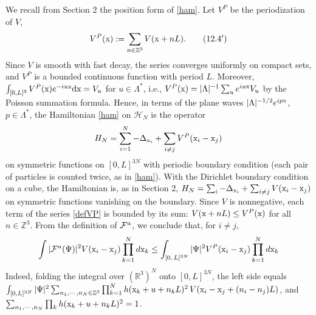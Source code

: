 \documentclass[11pt]{article}
\numberwithin{equation}{section}
\newcommand{\rd}{{\rm d}}
\newcommand{\x}{{\rm x}}
\newcommand{\beq}{\begin{equation}}
\newcommand{\eeq}{\end{equation}}
\newcommand\Z{{\mathbb Z}}
\newcommand\R{{\mathbb R}}
\theoremstyle{definition}
\begin{document}
We recall from Section 2 the position form of \eqref{ham}. Let $V^P$ be the periodization of $V$,
\[
V^P(\x):=\sum_{n\in\Z^3}V(\x+nL) . \tag{12.4$'$}\label{defVP}
\]
Since $V$ is smooth with fast decay, the series converges uniformly on compact sets, and $V^P$ is a bounded continuous function with period $L$. Moreover,
$\int_{[0,L]^3}V^P(\x)e^{-iu\x}\rd\x=V_u$ for $u\in\Lambda^*$, i.e., $V^P(\x)=|\Lambda|^{-1}\sum_{u}e^{iu\x}V_u$ by the Poisson summation formula.
Hence, in terms of the plane waves $|\Lambda|^{-1/2}e^{ip\x}$, $p\in\Lambda^*$, the Hamiltonian \eqref{ham} on $\mathcal H_N$ is the operator
\[
H_N=\sum_{i=1}^N-\Delta_{\x_i}+\sum_{i\neq j}V^P(\x_i-\x_j)
\]
on symmetric functions on $[0,L]^{3N}$ with periodic boundary condition (each pair of particles is counted twice, as in \eqref{ham}).
With the Dirichlet boundary condition on a cube, the Hamiltonian is, as in Section 2, $H_N=\sum_{i}-\Delta_{\x_i}+\sum_{i\neq j}V(\x_i-\x_j)$ on symmetric functions vanishing on the boundary.
%
Since $V$ is nonnegative, each term of the series \eqref{defVP} is bounded by its sum: $V(\x+nL)\leq V^P(\x)$ for all $n\in\Z^3$.
{F}rom the definition of    ${\cal F}^u$, we conclude that, for $i\neq j$,
\beq\nonumber
\int |{\cal F}^u(\Psi)|^2V(\x_i-\x_j)\prod_{k=1}^N d\x_k \le
\int_{[0,\,L]^{3N}} |\Psi|^2 V^P(\x_i-\x_j)\prod_{k=1}^Nd\x_k
\eeq
Indeed, folding the integral over $(\R^3)^N$ onto $[0,L]^{3N}$, the left side equals
$\int_{[0,L]^{3N}}|\Psi|^2\sum_{n_1,\cdots,n_N\in\Z^3}\prod_{k=1}^Nh(\x_k+u+n_kL)^2\,V(\x_i-\x_j+(n_i-n_j)L)$, and $\sum_{n_1,\cdots,n_N}\prod_kh(\x_k+u+n_kL)^2=1$.
\end{document}
